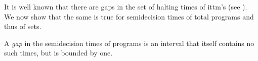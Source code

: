 \documentclass[a4paper,11pt]{amsart}
\theoremstyle{definition}
\newtheorem{definition}[fact]{Definition}
\newtheorem*{problem A}{Problem 1}
\newtheorem*{problem B}{Problem 2}
\theoremstyle{remark}
\begin{document}
It is well known that there are gaps in the set of halting times of ittm's (see \cite[Section 3]{hamkins2000infinite}). 
We now show that the same is true for semidecision times of total programs and thus of sets. 



A \emph{gap} in the semidecision times of programs is an interval that itself contains no such times, but is bounded by one. 





\end{document}
